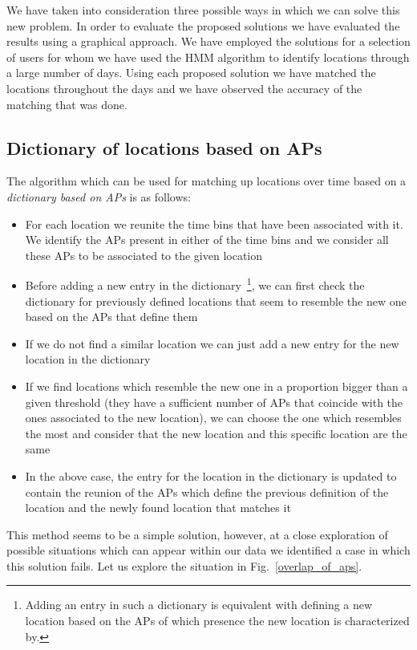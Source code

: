 We have taken into consideration three possible ways in which we can solve this
new problem. In order to evaluate the proposed solutions we have evaluated the
results using a graphical approach. We have employed the solutions for a
selection of users for whom we have used the HMM algorithm to identify
locations through a large number of days. Using each proposed solution we have
matched the locations throughout the days and we have observed the accuracy of
the matching that was done.

\subsection{Dictionary of locations based on APs}
\label{dictionary_aps}
The algorithm which can be used for matching up locations over time based on a
\textit{dictionary based on APs} is as follows:
\begin{itemize}
  \item For each location we reunite the time bins that have been associated
  with it. We identify the APs present in either of the time bins and we consider
  all these APs to be associated to the given location
  \item Before adding a new entry in the dictionary~\footnote{Adding an entry
  in such a dictionary is equivalent with defining a new location based on the
  APs of which presence the new location is characterized by.}, we can first
  check the dictionary for previously defined locations that seem to resemble
  the new one based on the APs that define them
  \item If we do not find a similar location we can just add a new entry for the
  new location in the dictionary
  \item If we find locations which resemble the new one in a proportion bigger
  than a given threshold (they have a sufficient number of APs that coincide
  with the ones associated to the new location), we can choose the one which
  resembles the most and consider that the new location and this specific
  location are the same
  \item In the above case, the entry for the location in the dictionary is
  updated to contain the reunion of the APs which define the previous definition
  of the location and the newly found location that matches it
\end{itemize}

This method seems to be a simple solution, however, at a close exploration of
possible situations which can appear within our data we identified a case in
which this solution fails. Let us explore the situation in
Fig.~\ref{overlap_of_aps}. 


